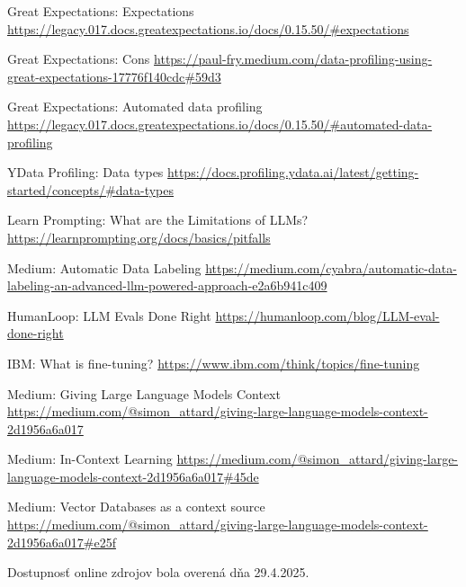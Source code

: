 \begin{thebibliography}{99}
Great Expectations: Expectations
\url{https://legacy.017.docs.greatexpectations.io/docs/0.15.50/#expectations}

Great Expectations: Cons
\url{https://paul-fry.medium.com/data-profiling-using-great-expectations-17776f140cdc#59d3}

Great Expectations: Automated data profiling
\url{https://legacy.017.docs.greatexpectations.io/docs/0.15.50/#automated-data-profiling}

YData Profiling: Data types
\url{https://docs.profiling.ydata.ai/latest/getting-started/concepts/#data-types}

Learn Prompting: What are the Limitations of LLMs?
\url{https://learnprompting.org/docs/basics/pitfalls}

Medium: Automatic Data Labeling
\url{https://medium.com/cyabra/automatic-data-labeling-an-advanced-llm-powered-approach-e2a6b941c409}

HumanLoop: LLM Evals Done Right
\url{https://humanloop.com/blog/LLM-eval-done-right}

IBM: What is fine-tuning?
\url{https://www.ibm.com/think/topics/fine-tuning}

Medium: Giving Large Language Models Context
\url{https://medium.com/@simon_attard/giving-large-language-models-context-2d1956a6a017}

Medium: In-Context Learning
\url{https://medium.com/@simon_attard/giving-large-language-models-context-2d1956a6a017#45de}

Medium: Vector Databases as a context source
\url{https://medium.com/@simon_attard/giving-large-language-models-context-2d1956a6a017#e25f}
\end{thebibliography}

Dostupnosť online zdrojov bola overená dňa 29.4.2025.
